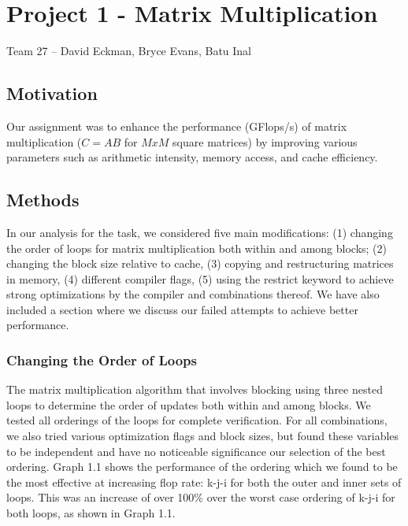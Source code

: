 \documentclass[12pt]{article}
\begin{document}
\noindent

\setlength{\parindent}{0cm}


\section*{Project 1 - Matrix Multiplication}
Team 27 \--- David Eckman, Bryce Evans, Batu Inal

\subsection*{Motivation}

Our assignment was to enhance the performance (GFlops/s) of matrix multiplication ($C = AB$ for $M x M$ square matrices) by improving various parameters such as arithmetic intensity, memory access, and cache efficiency.

\subsection*{Methods}

In our analysis for the task, we considered five main modifications: (1) changing the order of loops for matrix multiplication both within and among blocks; (2) changing the block size relative to cache, (3) copying and restructuring matrices in memory, (4) different compiler flags, (5) using the restrict keyword to achieve strong optimizations by the compiler and combinations thereof. We have also included a section where we discuss our failed attempts to achieve better performance.

\subsubsection{Changing the Order of Loops}

The matrix multiplication algorithm that involves blocking using three nested loops to determine the order of updates both within and among blocks. We tested all orderings of the loops for complete verification. For all combinations, we also tried various optimization flags and block sizes, but found these variables to be independent and have no noticeable significance our selection of the best ordering. Graph 1.1 shows the performance of the ordering which we found to be the most effective at increasing flop rate: k-j-i for both the outer and inner sets of loops. This was an increase of over 100\% over the worst case ordering of k-j-i for both loops, as shown in Graph 1.1.
\end{document}
